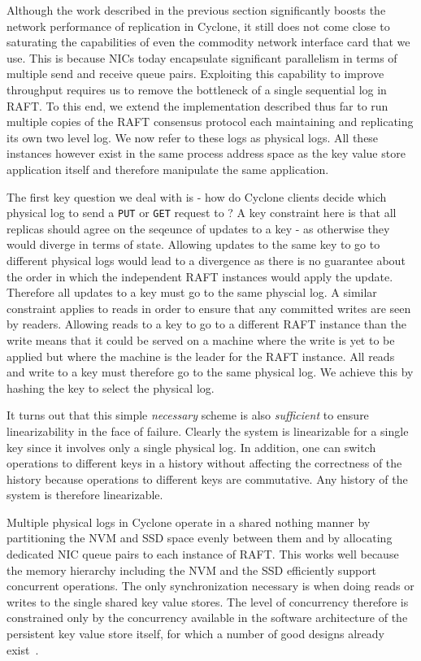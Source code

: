 \documentclass[pageno]{jpaper}
\begin{document}
Although the work described in the previous section significantly boosts the
network performance of replication in Cyclone, it still does not come close to
saturating the capabilities of even the commodity network interface card that we
use. This is because NICs today encapsulate significant parallelism in terms of
multiple send and receive queue pairs. Exploiting this capability to improve
throughput requires us to remove the bottleneck of a single sequential log in
RAFT. To this end, we extend the implementation described thus far to run
multiple copies of the RAFT consensus protocol each maintaining and replicating
its own two level log. We now refer to these logs as physical logs. All these
instances however exist in the same process address space as the key value store
application itself and therefore manipulate the same application.


The first key question we deal with is - how do Cyclone clients decide which
physical log to send a {\tt PUT} or {\tt GET} request to ? A key constraint here
is that all replicas should agree on the seqeunce of updates to a key - as
otherwise they would diverge in terms of state. Allowing updates to the same key
to go to different physical logs would lead to a divergence as there is no
guarantee about the order in which the independent RAFT instances would apply
the update. Therefore all updates to a key must go to the same physcial
log. A similar constraint applies to reads in order to ensure that any committed
writes are seen by readers. Allowing reads to a key to go to a different RAFT
instance than the write means that it could be served on a machine where the
write is yet to be applied but where the machine is the leader for the RAFT
instance. All reads and write to a key must therefore go to the same physical
log. We achieve this by hashing the key to select the physical log.

It turns out that this simple \emph{necessary} scheme is also \emph{sufficient}
to ensure linearizability in the face of failure. Clearly the system is
linearizable for a single key since it involves only a single physical log. In
addition, one can switch operations to different keys in a history without
affecting the correctness of the history because operations to different keys
are commutative. Any history of the system is therefore linearizable.

Multiple physical logs in Cyclone operate in a shared nothing manner by
partitioning the NVM and SSD space evenly between them and by allocating
dedicated NIC queue pairs to each instance of RAFT. This works well because the
memory hierarchy including the NVM and the SSD efficiently support concurrent
operations. The only synchronization necessary is when doing reads or writes to
the single shared key value stores.  The level of concurrency therefore is
constrained only by the concurrency available in the software architecture of
the persistent key value store itself, for which a number of good designs
already exist~\cite{flodb}.
\end{document}
